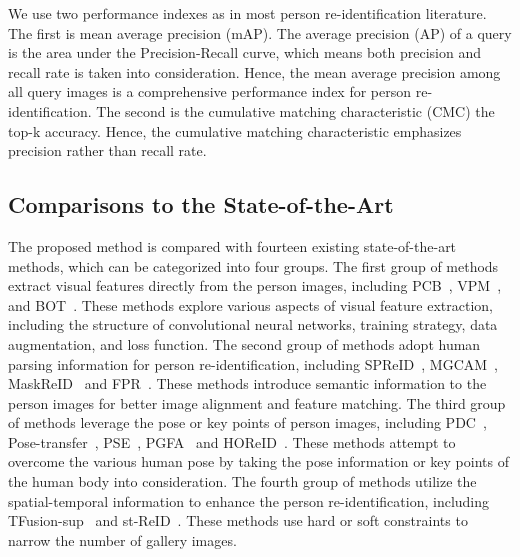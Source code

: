 \documentclass[10pt,twocolumn,letterpaper]{article}
\begin{document}
We use two performance indexes as in most person re-identification literature.
The first is mean average precision (mAP). The average precision (AP) of a query is the area under the Precision-Recall curve, which means both precision and recall rate is taken into consideration. Hence, the mean average precision among all query images is a comprehensive performance index for person re-identification.
The second is the cumulative matching characteristic (CMC) \ie the top-k accuracy. Hence, the cumulative matching characteristic emphasizes precision rather than recall rate.




\subsection{Comparisons to the State-of-the-Art}


The proposed method is compared with fourteen existing state-of-the-art methods, which can be categorized into four groups.
The first group of methods extract visual features directly from the person images, including PCB~\cite{2017Beyond}, VPM~\cite{Perceive2020Perceive}, and BOT~\cite{Luo2019Bag}. These methods explore various aspects of visual feature extraction, including the structure of convolutional neural networks, training strategy, data augmentation, and loss function.
The second group of methods adopt human parsing information for person re-identification, including SPReID~\cite{Kalayeh2018Human}, MGCAM~\cite{Song2018Mask}, MaskReID~\cite{2018MaskReID} and FPR~\cite{2020Foreground}. These methods introduce semantic information to the person images for better image alignment and feature matching.
The third group of methods leverage the pose or key points of person images, including PDC~\cite{Su2017Learning}, Pose-transfer~\cite{2018Pose}, PSE~\cite{2017A}, PGFA~\cite{2019Pose} and HOReID~\cite{Wang2020High}. These methods attempt to overcome the various human pose by taking the pose information or key points of the human body into consideration.
The fourth group of methods utilize the spatial-temporal information to enhance the person re-identification, including TFusion-sup~\cite{2018Unsupervised} and st-ReID~\cite{guangcong2019aaai}. These methods use hard or soft constraints to narrow the number of gallery images.
\end{document}
